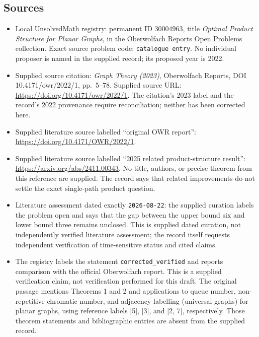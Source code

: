 \documentclass[11pt]{article}
\begin{document}
\subsection{Sources}
\begin{itemize}
\item Local UnsolvedMath registry: permanent ID \(30004963\), title \emph{Optimal Product Structure for Planar Graphs}, in the Oberwolfach Reports Open Problems collection. Exact source problem code: \texttt{catalogue entry}. No individual proposer is named in the supplied record; its proposed year is 2022.
\item Supplied source citation: \emph{Graph Theory (2023)}, Oberwolfach Reports, DOI 10.4171/owr/2022/1, pp.\ 5--78. Supplied source URL: \url{https://doi.org/10.4171/owr/2022/1}. The citation's 2023 label and the record's 2022 provenance require reconciliation; neither has been corrected here.
\item Supplied literature source labelled ``original OWR report'': \url{https://doi.org/10.4171/OWR/2022/1}.
\item Supplied literature source labelled ``2025 related product-structure result'': \url{https://arxiv.org/abs/2411.00343}. No title, authors, or precise theorem from this reference are supplied. The record says that related improvements do not settle the exact single-path product question.
\item Literature assessment dated exactly \texttt{2026-08-22}: the supplied curation labels the problem open and says that the gap between the upper bound six and lower bound three remains unclosed. This is supplied dated curation, not independently verified literature assessment; the record itself requests independent verification of time-sensitive status and cited claims.
\item The registry labels the statement \texttt{corrected\_verified} and reports comparison with the official Oberwolfach report. This is a supplied verification claim, not verification performed for this draft. The original passage mentions Theorems 1 and 2 and applications to queue number, non-repetitive chromatic number, and adjacency labelling (universal graphs) for planar graphs, using reference labels [5], [3], and [2, 7], respectively. Those theorem statements and bibliographic entries are absent from the supplied record.
\end{itemize}
\end{document}
